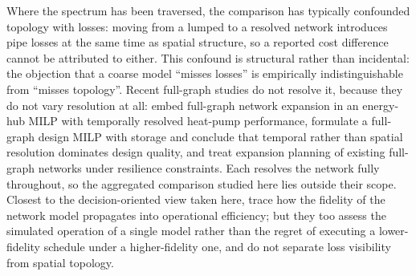 \documentclass[a4paper,fleqn]{cas-sc}
\providecommand{\citet}[1]{\cite{#1}}
\begin{document}
Where the spectrum has been traversed, the comparison has typically confounded topology
with losses: moving from a lumped to a resolved network introduces pipe losses at the same
time as spatial structure, so a reported cost difference cannot be attributed to either.
This confound is structural rather than incidental: the objection that a coarse model
``misses losses'' is empirically indistinguishable from ``misses topology''. Recent full-graph studies do not resolve it,
because they do not vary resolution at all: \citet{Trentmann2026} embed full-graph
network expansion in an energy-hub MILP with temporally resolved heat-pump performance,
\citet{Ceruti2025} formulate a full-graph design MILP with storage and conclude that
temporal rather than spatial resolution dominates design quality, and
\citet{Vieth2026} treat expansion planning of existing full-graph networks under
resilience constraints. Each resolves the network fully throughout, so the aggregated
comparison studied here lies outside their scope. Closest to the decision-oriented view
taken here, \citet{Friedrich2025} trace how the fidelity of the network model propagates
into operational efficiency; but they too assess the simulated operation of a single model
rather than the regret of executing a lower-fidelity schedule under a higher-fidelity one,
and do not separate loss visibility from spatial topology.
\end{document}
